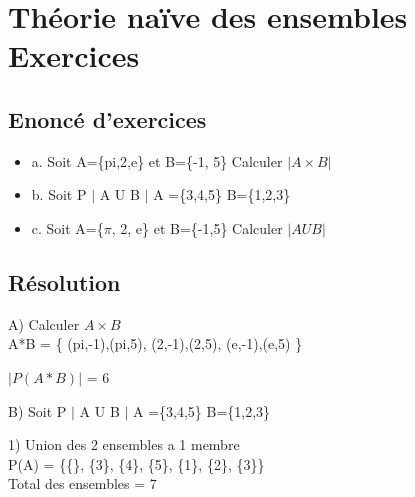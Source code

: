 \newpage

\section{Théorie naïve des ensembles Exercices}
\vspace{5mm} %

\subsection{Enoncé d'exercices}
\vspace{3mm} %

\begin{itemize}
\item {a. Soit A=\{pi,2,e\} et B=\{-1, 5\} Calculer ${|A\times B|}$}
\item {b. Soit P $|$ A U B $|$ A =\{3,4,5\} B=\{1,2,3\}}
\item {c. Soit A=\{$\pi$, 2, e\} et B=\{-1,5\} Calculer $|A U B|$}
\end{itemize}

\subsection{Résolution}
\vspace{4mm} %

A) Calculer ${A\times B}$ \\

A*B = \{ (pi,-1),(pi,5), (2,-1),(2,5), (e,-1),(e,5) \} \\

\vspace{3mm} %

$|P(A*B)|$ = 6 \\

\vspace{5mm} %

\newpage

B) Soit P $|$ A U B $|$ A =\{3,4,5\} B=\{1,2,3\} \\

\vspace{3mm} %

1) Union des 2 ensembles a 1 membre \\

P(A) = \{\{\}, \{3\}, \{4\}, \{5\}, \{1\}, \{2\}, \{3\}\} \\

Total des ensembles = 7 \\

